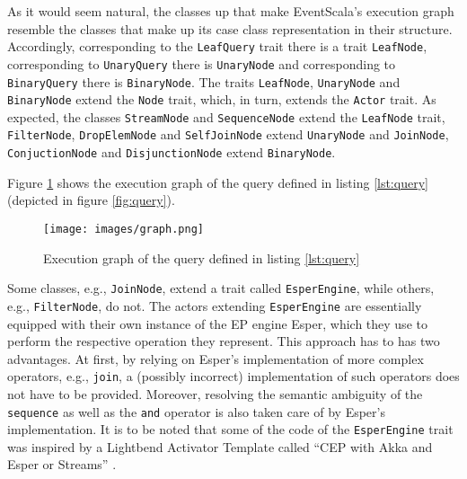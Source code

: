 \documentclass[article, type=bsc, colorback, accentcolor=tud8b, parskip=half, bibliography=totocnumbered]{tudthesis}
\begin{document}
As it would seem natural, the classes up that make EventScala's execution graph resemble the classes that make up its case class representation in their structure.
Accordingly, corresponding to the \lstinline{LeafQuery} trait there is a trait \lstinline{LeafNode}, corresponding to \lstinline{UnaryQuery} there is \lstinline{UnaryNode} and corresponding to \lstinline{BinaryQuery} there is \lstinline{BinaryNode}.
The traits \lstinline{LeafNode}, \lstinline{UnaryNode} and \lstinline{BinaryNode} extend the \lstinline{Node} trait, which, in turn, extends the \lstinline{Actor} trait.
As expected, the classes \lstinline{StreamNode} and \lstinline{SequenceNode} extend the \lstinline{LeafNode} trait, \lstinline{FilterNode}, \lstinline{DropElemNode} and \lstinline{SelfJoinNode} extend \lstinline{UnaryNode} and \lstinline{JoinNode}, \lstinline{ConjuctionNode} and \lstinline{DisjunctionNode} extend \lstinline{BinaryNode}.

Figure \ref{fig:graph} shows the execution graph of the query defined in listing \ref{lst:query} (depicted in figure \ref{fig:query}).

\begin{figure}
\caption{Execution graph of the query defined in listing \ref{lst:query}}
\label{fig:graph}
\texttt{[image: images/graph.png]}
\centering
\end{figure}

Some classes, e.g., \lstinline{JoinNode}, extend a trait called \lstinline{EsperEngine}, while others, e.g., \lstinline{FilterNode}, do not.
The actors extending \lstinline{EsperEngine} are essentially equipped with their own instance of the EP engine Esper, which they use to perform the respective operation they represent.
This approach has to has two advantages.
At first, by relying on Esper's implementation of more complex operators, e.g., \lstinline{join}, a (possibly incorrect) implementation of such operators does not have to be provided.
Moreover, resolving the semantic ambiguity of the \lstinline{sequence} as well as the \lstinline{and} operator is also taken care of by Esper's implementation.
It is to be noted that some of the code of the \lstinline{EsperEngine} trait was inspired by a Lightbend Activator Template called ``CEP with Akka and Esper or Streams'' \cite{akkacep}.
\end{document}
